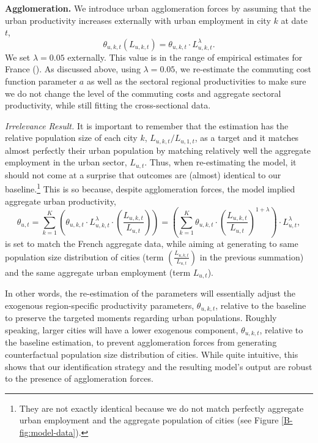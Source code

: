 \documentclass[11pt]{report}
\begin{document}
\textbf{Agglomeration.} We introduce urban agglomeration forces by assuming that the urban productivity increases externally with urban employment in city $k$ at date $t$, $$\theta_{u,k,t}(L_{u,k,t})= \theta_{u,k,t} \cdot L_{u,k,t}^{\lambda}.$$ We set $\lambda=0.05$ externally. This value is in the range of empirical estimates for France (\cite{combesetal2010}). As discussed above, using $\lambda=0.05$, we re-estimate the commuting cost function parameter $a$ as well as the sectoral regional productivities to make sure we do not change the level of the commuting costs and aggregate sectoral productivity, while still fitting the cross-sectional data. %

\emph{Irrelevance Result.} It is important to remember that the estimation has the relative population size of each city $k$, $L_{u,k,t}/L_{u,1,t}$, as a target and it matches almost perfectly their urban population by matching relatively well the aggregate employment in the urban sector, $L_{u,t}$. Thus, when re-estimating the model, it should not come at a surprise that outcomes are (almost) identical to our baseline.\footnote{They are not exactly identical because we do not match perfectly aggregate urban employment and the aggregate population of cities (see Figure \ref{B-fig:model-data}).} This is so because, despite agglomeration forces, the model implied aggregate urban productivity, 
\begin{equation}
\theta_{u,t}=\sum_{k=1}^{K}\left(\theta_{u,k,t} \cdot L_{u,k,t}^{\lambda} \cdot \left( \frac{L_{u,k,t}}{L_{u,t}}\right) \right)=\left(\sum_{k=1}^{K}\theta_{u,k,t} \cdot \left( \frac{L_{u,k,t}}{L_{u,t}}\right)^{1+\lambda}  \right)\cdot L_{u,t}^{\lambda}, \label{B-eq:agglo}
\end{equation}
is set to match the French aggregate data, while aiming at generating to same population size distribution of cities (term $\left(\frac{L_{u,k,t}}{L_{u,t}}\right)$ in the previous summation) and the same aggregate urban employment (term $L_{u,t}$). 

In other words, the re-estimation of the parameters will essentially adjust the exogenous region-specific productivity parameters, $\theta_{u,k,t}$, relative to the baseline to preserve the targeted moments regarding urban populations. Roughly speaking, larger cities will have a lower exogenous component, $\theta_{u,k,t}$, relative to the baseline estimation, to prevent agglomeration forces from generating counterfactual population size distribution of cities. While quite intuitive, this shows that our identification strategy and the resulting model's output are robust to the presence of agglomeration forces. 
\end{document}
